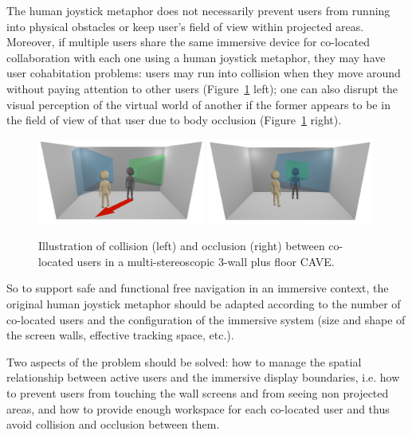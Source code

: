 The human joystick metaphor does not necessarily prevent users from running into physical obstacles or keep user's field of view within projected areas. Moreover, if multiple users share the same immersive device for co-located collaboration with each one using a human joystick metaphor, they may have user cohabitation problems: users may run into collision when they move around without paying attention to other users (Figure~\ref{fig:3_illustration} left); one can also disrupt the visual perception of the virtual world of another if the former appears to be in the field of view of that user due to body occlusion (Figure~\ref{fig:3_illustration} right).

\begin{figure}[tb]
  \centering
  \includegraphics[width=0.49\textwidth]{figures/ch3/illu_col}
  \includegraphics[width=0.49\textwidth]{figures/ch3/illu_occ}
  \caption{\label{fig:3_illustration}Illustration of collision (left) and occlusion (right) between co-located users in a multi-stereoscopic 3-wall plus floor CAVE.}
\end{figure}

So to support safe and functional free navigation in an immersive context, the original human joystick metaphor should be adapted according to the number of co-located users and the configuration of the immersive system (size and shape of the screen walls, effective tracking space, etc.).

Two aspects of the problem should be solved: how to manage the spatial relationship between active users and the immersive display boundaries, i.e. how to prevent users from touching the wall screens and from seeing non projected areas, and how to provide enough workspace for each co-located user and thus avoid collision and occlusion between them.

